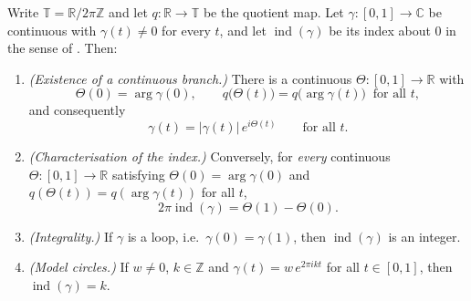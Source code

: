 \begin{lemma}
Write $\mathbb{T}=\mathbb{R}/2\pi\mathbb{Z}$ and let $q\colon\mathbb{R}\to\mathbb{T}$
be the quotient map.  Let $\gamma\colon[0,1]\to\mathbb{C}$ be continuous with
$\gamma(t)\neq0$ for every $t$, and let $\operatorname{ind}(\gamma)$ be its
index about $0$ in the sense of .  Then:
\begin{enumerate}
\item[(a)] \emph{(Existence of a continuous branch.)}  There is a continuous
$\Theta\colon[0,1]\to\mathbb{R}$ with
\[
  \Theta(0)=\arg\gamma(0),\qquad
  q\bigl(\Theta(t)\bigr)=q\bigl(\arg\gamma(t)\bigr)\ \text{ for all }t,
\]
and consequently
\[
  \gamma(t)=|\gamma(t)|\,e^{i\Theta(t)}\qquad\text{for all }t .
\]
\item[(b)] \emph{(Characterisation of the index.)}  Conversely, for \emph{every}
continuous $\Theta\colon[0,1]\to\mathbb{R}$ satisfying
$\Theta(0)=\arg\gamma(0)$ and $q(\Theta(t))=q(\arg\gamma(t))$ for all $t$,
\[
  2\pi\operatorname{ind}(\gamma)=\Theta(1)-\Theta(0).
\]
\item[(c)] \emph{(Integrality.)}  If $\gamma$ is a loop, i.e.\
$\gamma(0)=\gamma(1)$, then $\operatorname{ind}(\gamma)$ is an integer.
\item[(d)] \emph{(Model circles.)}  If $w\neq0$, $k\in\mathbb{Z}$ and
$\gamma(t)=w\,e^{2\pi ikt}$ for all $t\in[0,1]$, then
$\operatorname{ind}(\gamma)=k$.
\end{enumerate}
\end{lemma}
